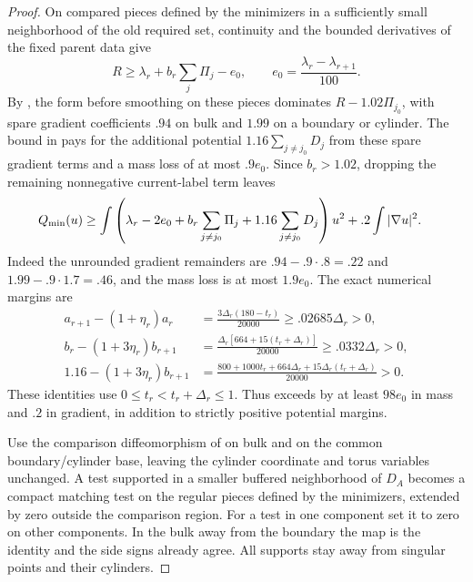 \begin{proof}
On compared pieces defined by the minimizers in a sufficiently small neighborhood of the
old required set, continuity and the bounded derivatives of the fixed
parent data give
\[
 R\ge\lambda_r+b_r\sum_j\Pi_j-e_0,
 \qquad e_0=\frac{\lambda_r-\lambda_{r+1}}{100}.
\]
By , the form before smoothing on these pieces
dominates $R-1.02\Pi_{j_0}$, with spare gradient coefficients $.94$
on bulk and $1.99$ on a boundary or cylinder.  The bound in
 pays for the additional potential
$1.16\sum_{j\ne j_0}D_j$ from these spare gradient terms and a mass
loss of at most $.9e_0$.  Since
$b_r>1.02$, dropping the remaining nonnegative current-label term
leaves
\begin{align}
 Q_{\rm min}(u)&\ge
 \int\left(\lambda_r-2e_0+
       b_r\sum_{j\ne j_0}\Pi_j+
       1.16\sum_{j\ne j_0}D_j\right)u^2
       +.2\int|\nabla u|^2.\label{regular:minimizing-budget}
\end{align}
Indeed the unrounded gradient remainders are
$.94-.9\cdot.8=.22$ and $1.99-.9\cdot1.7=.46$, and the mass loss is
at most $1.9e_0$.  The exact numerical margins are
\begin{equation}\label{regular:eta}
\begin{aligned}
 a_{r+1}-(1+\eta_r)a_r
   &=\frac{3\Delta_r(180-t_r)}{20000}
     \ge .02685\Delta_r>0,\\
 b_r-(1+3\eta_r)b_{r+1}
   &=\frac{\Delta_r[664+15(t_r+\Delta_r)]}{20000}
     \ge .0332\Delta_r>0,\\
 1.16-(1+3\eta_r)b_{r+1}
   &=\frac{800+1000t_r+664\Delta_r+
                  15\Delta_r(t_r+\Delta_r)}{20000}>0.
\end{aligned}
\end{equation}
These identities use $0\le t_r<t_r+\Delta_r\le1$.  Thus
 exceeds
 by at least $98e_0$ in mass and $.2$ in
gradient, in addition to strictly positive potential margins.

Use the comparison diffeomorphism of  on bulk
and on the common boundary/cylinder base, leaving the cylinder coordinate
and torus variables unchanged.  A test supported in a smaller buffered
neighborhood of $D_A$ becomes a compact matching test on the regular pieces defined by the minimizers, extended by zero outside the comparison region.  For
a test in one component set it to zero on other components.  In the
bulk away from the boundary the map is the identity and the side signs
already agree.  All supports stay away from singular points and their
cylinders.


\end{proof}
